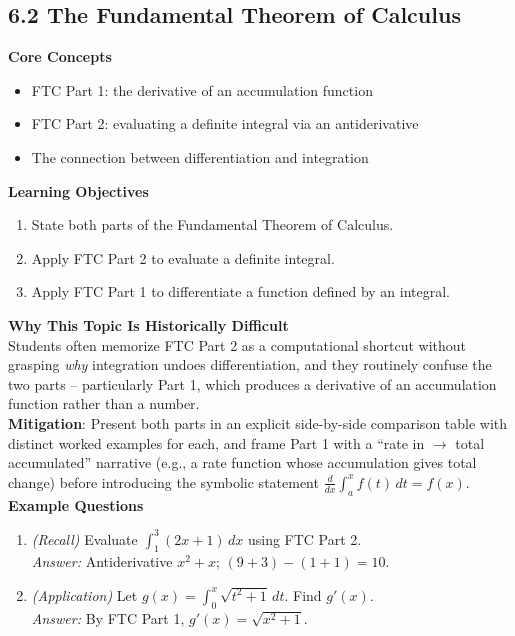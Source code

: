 \documentclass[11pt]{article}
\begin{document}
\subsection{6.2 The Fundamental Theorem of Calculus}
\textbf{Core Concepts}
\begin{itemize}
\item FTC Part 1: the derivative of an accumulation function
\item FTC Part 2: evaluating a definite integral via an antiderivative
\item The connection between differentiation and integration
\end{itemize}
\textbf{Learning Objectives}
\begin{enumerate}
\item State both parts of the Fundamental Theorem of Calculus.
\item Apply FTC Part 2 to evaluate a definite integral.
\item Apply FTC Part 1 to differentiate a function defined by an integral.
\end{enumerate}
\textbf{Why This Topic Is Historically Difficult} \\
Students often memorize FTC Part 2 as a computational shortcut without grasping \emph{why} integration undoes differentiation, and they routinely confuse the two parts -- particularly Part 1, which produces a derivative of an accumulation function rather than a number. \\
\textbf{Mitigation}: Present both parts in an explicit side-by-side comparison table with distinct worked examples for each, and frame Part 1 with a ``rate in $\to$ total accumulated'' narrative (e.g., a rate function whose accumulation gives total change) before introducing the symbolic statement $\frac{d}{dx}\int_a^x f(t)\,dt = f(x)$.
\textbf{Example Questions}
\begin{enumerate}
\item \emph{(Recall)} Evaluate $\displaystyle\int_1^3 (2x+1)\,dx$ using FTC Part 2. \\
\textit{Answer:} Antiderivative $x^2+x$; $(9+3)-(1+1)=10$.
\item \emph{(Application)} Let $g(x) = \displaystyle\int_0^x \sqrt{t^2+1}\,dt$. Find $g'(x)$. \\
\textit{Answer:} By FTC Part 1, $g'(x) = \sqrt{x^2+1}$.
\end{enumerate}
\end{document}

